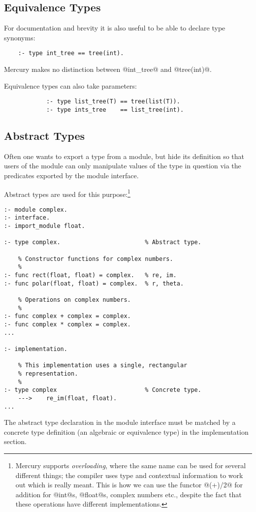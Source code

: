 \documentclass[a4paper,11pt,notitlepage,onecolumn]{article}
\begin{document}
\subsection{Equivalence Types}

For documentation and brevity it is also useful to be able to
declare type synonyms:
\begin{verbatim}
    :- type int_tree == tree(int).
\end{verbatim}
Mercury makes no distinction between @int_tree@ and
@tree(int)@.

Equivalence types can also take parameters:
\begin{verbatim}
            :- type list_tree(T) == tree(list(T)).
            :- type ints_tree    == list_tree(int).
\end{verbatim}

\subsection{Abstract Types}

Often one wants to export a type from a module, but hide its
definition so that users of the module can only manipulate
values of the type in question via the predicates exported by
the module interface.

Abstract types are used for this purpose:\footnote{Mercury supports \emph{overloading}, where the same name can
be used for several different things; the compiler uses type and
contextual information to work out which is really meant.  This is how
we can use the functor @(+)/2@ for addition for @int@s, @float@s,
complex numbers etc., despite the fact that these operations have
different implementations.}
\begin{verbatim}
:- module complex.
:- interface.
:- import_module float.

:- type complex.                        % Abstract type.

    % Constructor functions for complex numbers.
    %
:- func rect(float, float) = complex.   % re, im.
:- func polar(float, float) = complex.  % r, theta.

    % Operations on complex numbers.
    %
:- func complex + complex = complex.
:- func complex * complex = complex.
...

:- implementation.

    % This implementation uses a single, rectangular
    % representation.
    %
:- type complex                         % Concrete type.
    --->    re_im(float, float).
...
\end{verbatim}
The abstract type declaration in the module interface must be
matched by a concrete type definition (an algebraic or
equivalence type) in the implementation section.
\end{document}
